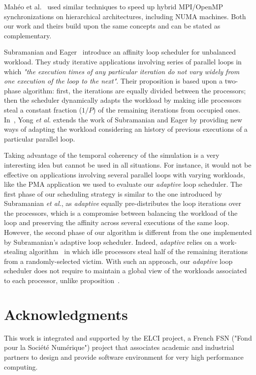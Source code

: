 \documentclass{Styles/llncs}
\begin{document}
Mahéo et al.~\cite{Maheo-MPC-OpenMP} used similar techniques to
speed up hybrid MPI/OpenMP synchronizations on hierarchical
architectures, including NUMA machines. Both our work and theirs build
upon the same concepts and can be stated as complementary.

Subramanian and Eager~\cite{Subramaniam:1994} introduce an affinity
loop scheduler for unbalanced workload. They study iterative
applications involving series of parallel loops in which \textit{"the
  execution times of any particular iteration do not vary widely from
  one execution of the loop to the
  next"}\cite{Subramaniam:1994}. Their proposition is based upon a
two-phase algorithm: first, the iterations are equally divided between
the processors; then the scheduler dynamically adapts the workload by
making idle processors steal a constant fraction ($1/P$) of the
remaining iterations from occupied ones. In~\cite{Yong97}, Yong
\textit{et al.}  extends the work of Subramanian and Eager by
providing new ways of adapting the workload considering an history of
previous executions of a particular parallel loop.

Taking advantage of the temporal coherency of the simulation is a very
interesting idea but cannot be used in all situations. For instance,
it would not be effective on applications involving several parallel
loops with varying workloads, like the PMA application we used to
evaluate our \textit{adaptive} loop scheduler. The first phase of our
scheduling strategy is similar to the one introduced by Subramanian
\textit{et al.}, as \textit{adaptive} equally pre-distributes the loop
iterations over the processors, which is a compromise between
balancing the workload of the loop and preserving the affinity across
several executions of the same loop. However, the second phase of our
algorithm is different from the one implemented by Subramanian's
adaptive loop scheduler. Indeed, \textit{adaptive} relies on a
work-stealing algorithm~\cite{Frigo:1998:ICM:277652.277725} in which
idle processors steal half of the remaining iterations from a
randomly-selected victim. With such an approach, our \textit{adaptive}
loop scheduler does not require to maintain a global view of the
workloads associated to each processor, unlike
proposition~\cite{Subramaniam:1994}.



\section*{Acknowledgments}


This work is integrated and supported by the ELCI  project, a French FSN ("Fond pour la Société Numérique")
project that associates academic and industrial partners to design and provide software environment for very high performance
computing.
  \small 

\end{document}
